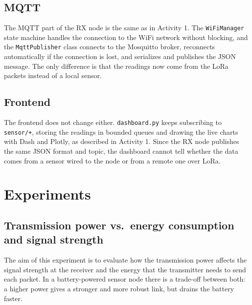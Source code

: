 \documentclass[informe,english]{plantilla}
\providecommand{\todo}[1]{\textcolor{red}{\textbf{[TODO: #1]}}}
\begin{document}
\subsection{MQTT}

The MQTT part of the RX node is the same as in Activity 1. The \texttt{WiFiManager} state machine handles the connection to the WiFi network without blocking, and the \texttt{MqttPublisher} class connects to the Mosquitto broker, reconnects automatically if the connection is lost, and serializes and publishes the JSON message. The only difference is that the readings now come from the LoRa packets instead of a local sensor.

\subsection{Frontend}

The frontend does not change either. \texttt{dashboard.py} keeps subscribing to \texttt{sensor/+}, storing the readings in bounded queues and drawing the live charts with Dash and Plotly, as described in Activity 1. Since the RX node publishes the same JSON format and topic, the dashboard cannot tell whether the data comes from a sensor wired to the node or from a remote one over LoRa.


\providecommand{\todo}[1]{\textcolor{red}{\textbf{[TODO: #1]}}}




\section{Experiments}
\label{sec:experiments}

\subsection{Transmission power vs.\ energy consumption and signal strength}
\label{sec:exp-txpower}

The aim of this experiment is to evaluate how the transmission power affects
the signal strength at the receiver and the energy that the transmitter needs
to send each packet. In a battery-powered sensor node there is a trade-off
between both: a higher power gives a stronger and more robust link, but
drains the battery faster.
\end{document}
